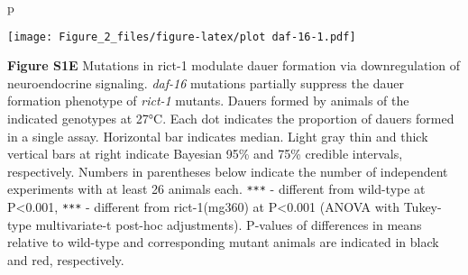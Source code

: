 \documentclass[]{article}
\newenvironment{Shaded}{\begin{snugshade}}{\end{snugshade}}
\newcommand{\KeywordTok}[1]{\textcolor[rgb]{0.13,0.29,0.53}{\textbf{#1}}}
\newcommand{\DataTypeTok}[1]{\textcolor[rgb]{0.13,0.29,0.53}{#1}}
\newcommand{\DecValTok}[1]{\textcolor[rgb]{0.00,0.00,0.81}{#1}}
\newcommand{\FloatTok}[1]{\textcolor[rgb]{0.00,0.00,0.81}{#1}}
\newcommand{\StringTok}[1]{\textcolor[rgb]{0.31,0.60,0.02}{#1}}
\newcommand{\CommentTok}[1]{\textcolor[rgb]{0.56,0.35,0.01}{\textit{#1}}}
\newcommand{\OperatorTok}[1]{\textcolor[rgb]{0.81,0.36,0.00}{\textbf{#1}}}
\newcommand{\NormalTok}[1]{#1}
\begin{document}
\begin{Shaded}
\end{Shaded}

\begin{Shaded}
\begin{Highlighting}[]
\NormalTok{p}
\end{Highlighting}
\end{Shaded}

\texttt{[image: Figure\_2\_files/figure-latex/plot daf-16-1.pdf]}

 \textbf{Figure S1E} Mutations in rict-1 modulate dauer formation via
downregulation of neuroendocrine signaling. \emph{daf-16} mutations
partially suppress the dauer formation phenotype of \emph{rict-1}
mutants. Dauers formed by animals of the indicated genotypes at 27°C.
Each dot indicates the proportion of dauers formed in a single assay.
Horizontal bar indicates median. Light gray thin and thick vertical bars
at right indicate Bayesian 95\% and 75\% credible intervals,
respectively. Numbers in parentheses below indicate the number of
independent experiments with at least 26 animals each. {\texttt{***}} -
different from wild-type at P\textless{}0.001, {\texttt{***}} -
different from rict-1(mg360) at P\textless{}0.001 (ANOVA with Tukey-type
multivariate-t post-hoc adjustments). P-values of differences in means
relative to wild-type and corresponding mutant animals are indicated in
black and red, respectively.
\end{document}

